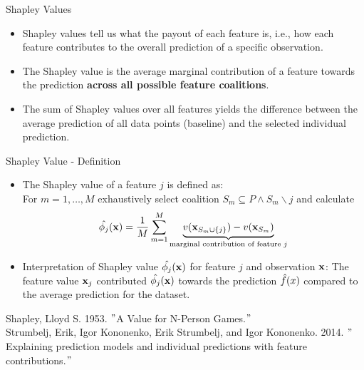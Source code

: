 \documentclass[11pt,compress,t,notes=noshow, aspectratio=169, xcolor=table]{beamer}
\begin{document}
\begin{vbframe}{Shapley Values}
\begin{itemize}
 \item Shapley values tell us what the payout of each feature is, i.e., how each feature contributes to the overall prediction of a specific observation.  
    \item The Shapley value is the average marginal contribution of a feature towards the prediction \textbf{across all possible feature coalitions}.
    \item The sum of Shapley values over all features yields the difference between the average prediction of all data points (baseline) and the selected individual prediction.
  \end{itemize}
\end{vbframe}



\begin{vbframe}{Shapley Value - Definition}
\begin{itemize}
  \item The Shapley value of a feature $j$ is defined as:\\ 
  For $m = 1, \dots, M$ exhaustively select coalition $S_m \subseteq P \land S_m \backslash j$  and calculate
$$ \hat{\phi_{j}}(\mathbf{x}) = \frac{1}{M} \sum_{m=1}^{M} \underbrace{v(\mathbf{x}_{S_m \cup \{j \} }) - v(\mathbf{x}_{S_m})}_{\text{marginal contribution of feature $j$}} $$
\lz
  \item Interpretation of Shapley value $\hat{\phi_{j}}(\mathbf{x})$ for feature $j$ and observation $\mathbf{x}$: 
  The feature value $\mathbf{x}_{j}$ contributed $\hat{\phi_{j}}(\mathbf{x})$ towards the prediction $\hat{f}(x)$ compared to the average prediction for the dataset.
\end{itemize}
\lz
\tiny
Shapley, Lloyd S. 1953. $"$A Value for N-Person Games.$"$\\
\vspace{0.2cm}
Strumbelj, Erik, Igor Kononenko, Erik Strumbelj, and Igor Kononenko. 2014. $"$Explaining prediction models and individual predictions with feature contributions.$"$

\end{vbframe}
\end{document}
